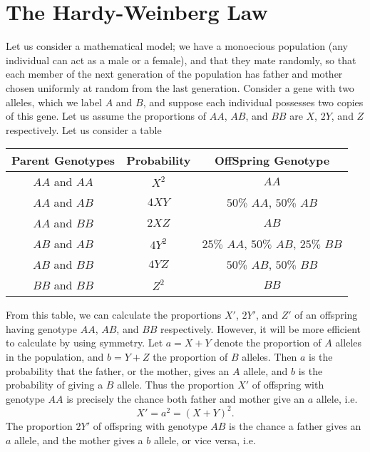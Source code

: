 \section{The Hardy-Weinberg Law}

Let us consider a mathematical model; we have a monoecious population (any individual can act as a male or a female), and that they mate randomly, so that each member of the next generation of the population has father and mother chosen uniformly at random from the last generation. Consider a gene with two alleles, which we label $A$ and $B$, and suppose each individual possesses two copies of this gene. Let us assume the proportions of $AA$, $AB$, and $BB$ are $X$, $2Y$, and $Z$ respectively. Let us consider a table

\begin{center}
\begin{tabular}{| c | c | c |}
\hline
Parent Genotypes & Probability & OffSpring Genotype\\
\hline
$AA$ and $AA$ & $X^2$ & $AA$\\
$AA$ and $AB$ & $4XY$ & $50\%$ $AA$, $50\%$ $AB$\\
$AA$ and $BB$ & $2XZ$ & $AB$\\
$AB$ and $AB$ & $4Y^2$ & $25\%$ $AA$, $50\%$ $AB$, $25\%$ $BB$\\
$AB$ and $BB$ & $4YZ$ & $50\%$ $AB$, $50\%$ $BB$\\
$BB$ and $BB$ & $Z^2$ & $BB$\\
\hline
\end{tabular}
\end{center}

From this table, we can calculate the proportions $X'$, $2Y'$, and $Z'$ of an offspring having genotype $AA$, $AB$, and $BB$ respectively. However, it will be more efficient to calculate by using symmetry. Let $a = X + Y$ denote the proportion of $A$ alleles in the population, and $b = Y + Z$ the proportion of $B$ alleles. Then $a$ is the probability that the father, or the mother, gives an $A$ allele, and $b$ is the probability of giving a $B$ allele. Thus the proportion $X'$ of offspring with genotype $AA$ is precisely the chance both father and mother give an $a$ allele, i.e.
%
\[ X' = a^2 = (X + Y)^2. \]
%
The proportion $2Y'$ of offspring with genotype $AB$ is the chance a father gives an $a$ allele, and the mother gives a $b$ allele, or vice versa, i.e.

